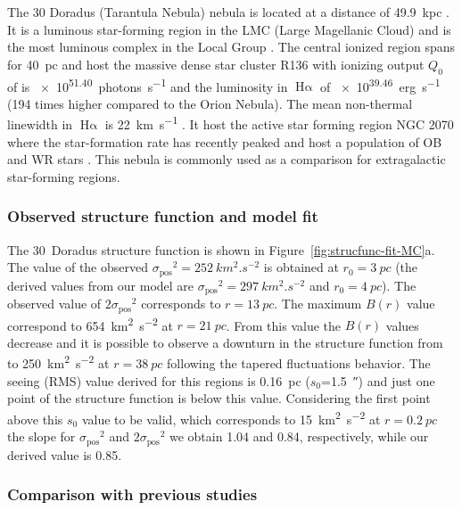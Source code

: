\documentclass[fleqn,usenatbib, useAMS, a4paper]{mnras}
\newcommand\pos{\ensuremath{_{\mathrm{pos}}}}
\newcommand\ha{\ensuremath{\text{H}\upalpha}}
\begin{document}
The 30 Doradus (Tarantula Nebula) nebula is located at a distance of \SI{49.9}{kpc} \citetext{\SI{1}{\arcsecond} = \SI{0.24}{pc} ; \citealp{2013Natur.495...76P}}.
It is a luminous star-forming region in the LMC (Large Magellanic Cloud) and is the most luminous complex in the Local Group \citep{1984ApJ...287..116K}.
The central ionized region spans for \SI{40}{pc} and host the massive dense star cluster R136
with ionizing output \(Q_0\) of is \SI{e51.40}{photons.s^{-1}} \citep{2020MNRAS.499.1918B} and the luminosity in \ha{} of \SI{e39.46}{erg.s^{-1}} (194 times higher compared to the Orion Nebula).
The mean non-thermal linewidth in \ha{} is \SI{22}{km.s^{-1}} \citep{2013A&A...555A..60T}.
It host the active star forming region NGC 2070 \citep{2013AJ....145...98W} where the star-formation rate has recently peaked \citep{2015ApJ...811...76C} and host a population of OB and WR stars \citep{2011A&A...530A.108E}.
This nebula is commonly used as a comparison for extragalactic star-forming regions.

\subsubsection{Observed structure function and model fit}
\label{sec:observ-struct-funct-30dor}

The 30~Doradus structure function is shown in Figure~\ref{fig:strucfunc-fit-MC}a.
The value of the observed \(\sigma\pos^2 = \SI{252}{km^{2}.s^{-2}}\) is obtained at \(r_0 = \SI{3}{pc} \) (the derived values from our model are \(\sigma\pos^2 = \SI{297}{km^{2}.s^{-2}}\) and \(r_0 = \SI{4}{pc} \)).
The observed value of \(2\sigma\pos^2\) corresponds to \(r = \SI{13}{pc} \).
The maximum \(B(r)\) value correspond to \SI{654}{km^{2}.s^{-2}} at \(r = \SI{21}{pc}\).
From this value the \(B(r)\) values decrease and it is possible to observe a downturn in the structure function from to \SI{250}{km^{2}.s^{-2}} at \(r =  \SI{38}{pc}\) following the tapered fluctuations behavior.
The seeing (RMS) value derived for this regions is \SI{0.16}{pc} (\(s_0\)=\SI{1.5}{\arcsecond}) and just one point of the structure function is below this value.
Considering the first point above this \(s_0\) value to be valid, which corresponds to \SI{15}{km^{2}.s^{-2}} at \(r = \SI{0.2}{pc} \) the slope for \(\sigma\pos^2\) and \(2\sigma\pos^2\) we obtain \num{1.04} and \num{0.84}, respectively, while our derived value is \num{0.85}.

\subsubsection{Comparison with previous studies}
\label{sec:comparison-30dor}
\end{document}
